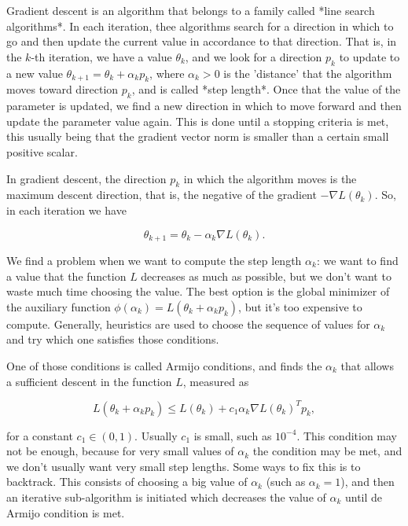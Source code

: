 Gradient descent is an algorithm that belongs to a family called *line search algorithms*. In each iteration, thee algorithms search for a direction in which to go and then update the current value in accordance to that direction. That is, in the $k$-th iteration, we have a value $\theta_k$, and we look for a direction $p_k$ to update to a new value $\theta_{k+1} = \theta_k + \alpha_k p_k$, where $\alpha_k > 0$ is the 'distance' that the algorithm moves toward direction $p_k$, and is called *step length*. Once that the value of the parameter is updated, we find a new direction in which to move forward and then update the parameter value again. This is done until a stopping criteria is met, this usually being that the gradient vector norm is smaller than a certain small positive scalar.

In gradient descent, the direction $p_k$ in which the algorithm moves is the maximum descent direction, that is, the negative of the gradient $-\nabla L(\theta_k)$. So, in each iteration we have

\begin{equation}
  \theta_{k+1} = \theta_k - \alpha_k \nabla L(\theta_k).
\end{equation}

We find a problem when we want to compute the step length $\alpha_k$: we want to find a value that the function $L$ decreases as much as possible, but we don't want to waste much time choosing the value. The best option is the global minimizer of the auxiliary function $\phi(\alpha_k) = L(\theta_k + \alpha_k p_k)$, but it's too expensive to compute. Generally, heuristics are used to choose the sequence of values for $\alpha_k$ and try which one satisfies those conditions.

One of those conditions is called Armijo conditions, and finds the $\alpha_k$ that allows a sufficient descent in the function $L$, measured as

$$
L(\theta_k + \alpha_k p_k) \leq L(\theta_k) + c_1 \alpha_k \nabla L(\theta_k)^T p_k,
$$

for a constant $c_1 \in (0, 1)$. Usually $c_1$ is small, such as $10^{-4}$. This condition may not be enough, because for very small values of $\alpha_k$ the condition may be met, and we don't usually want very small step lengths. Some ways to fix this is to backtrack. This consists of choosing a big value of $\alpha_k$ (such as $\alpha_k = 1$), and then an iterative sub-algorithm is initiated which decreases the value of $\alpha_k$ until de Armijo condition is met.

